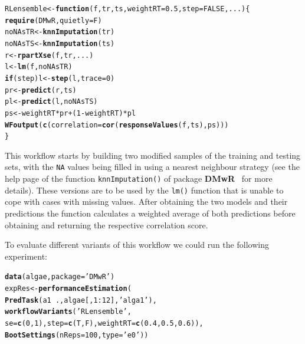 \documentclass[10pt,a4paper]{article}\usepackage[]{graphicx}\usepackage[]{color}
\makeatletter
\newcommand{\hlnum}[1]{\textcolor[rgb]{0.686,0.059,0.569}{#1}}%
\newcommand{\hlstr}[1]{\textcolor[rgb]{0.192,0.494,0.8}{#1}}%
\newcommand{\hlopt}[1]{\textcolor[rgb]{0,0,0}{#1}}%
\newcommand{\hlstd}[1]{\textcolor[rgb]{0.345,0.345,0.345}{#1}}%
\newcommand{\hlkwa}[1]{\textcolor[rgb]{0.161,0.373,0.58}{\textbf{#1}}}%
\newcommand{\hlkwb}[1]{\textcolor[rgb]{0.69,0.353,0.396}{#1}}%
\newcommand{\hlkwc}[1]{\textcolor[rgb]{0.333,0.667,0.333}{#1}}%
\newcommand{\hlkwd}[1]{\textcolor[rgb]{0.737,0.353,0.396}{\textbf{#1}}}%
\newenvironment{kframe}{%
 \def\at@end@of@kframe{}%
 \ifinner\ifhmode%
  \def\at@end@of@kframe{\end{minipage}}%
  \begin{minipage}{\columnwidth}%
 \fi\fi%
 \def\FrameCommand##1{\hskip\@totalleftmargin \hskip-\fboxsep
 \colorbox{shadecolor}{##1}\hskip-\fboxsep
     \hskip-\linewidth \hskip-\@totalleftmargin \hskip\columnwidth}%
 \MakeFramed {\advance\hsize-\width
   \@totalleftmargin\z@ \linewidth\hsize
   \@setminipage}}%
 {\par\unskip\endMakeFramed%
 \at@end@of@kframe}
\newenvironment{knitrout}{}{} %
\makeatother
\begin{document}
\begin{knitrout}
\color{fgcolor}\begin{kframe}
\begin{alltt}
\hlstd{RLensemble} \hlkwb{<-} \hlkwa{function}\hlstd{(}\hlkwc{f}\hlstd{,}\hlkwc{tr}\hlstd{,}\hlkwc{ts}\hlstd{,}\hlkwc{weightRT}\hlstd{=}\hlnum{0.5}\hlstd{,}\hlkwc{step}\hlstd{=}\hlnum{FALSE}\hlstd{,}\hlkwc{...}\hlstd{) \{}
  \hlkwd{require}\hlstd{(DMwR,}\hlkwc{quietly}\hlstd{=F)}
  \hlstd{noNAsTR} \hlkwb{<-} \hlkwd{knnImputation}\hlstd{(tr)}
  \hlstd{noNAsTS} \hlkwb{<-} \hlkwd{knnImputation}\hlstd{(ts)}
  \hlstd{r} \hlkwb{<-} \hlkwd{rpartXse}\hlstd{(f,tr,...)}
  \hlstd{l} \hlkwb{<-} \hlkwd{lm}\hlstd{(f,noNAsTR)}
  \hlkwa{if} \hlstd{(step) l} \hlkwb{<-} \hlkwd{step}\hlstd{(l,}\hlkwc{trace}\hlstd{=}\hlnum{0}\hlstd{)}
  \hlstd{pr} \hlkwb{<-} \hlkwd{predict}\hlstd{(r,ts)}
  \hlstd{pl} \hlkwb{<-} \hlkwd{predict}\hlstd{(l,noNAsTS)}
  \hlstd{ps} \hlkwb{<-} \hlstd{weightRT}\hlopt{*}\hlstd{pr}\hlopt{+}\hlstd{(}\hlnum{1}\hlopt{-}\hlstd{weightRT)}\hlopt{*}\hlstd{pl}
  \hlkwd{WFoutput}\hlstd{(}\hlkwd{c}\hlstd{(}\hlkwc{correlation}\hlstd{=}\hlkwd{cor}\hlstd{(}\hlkwd{responseValues}\hlstd{(f,ts),ps)))}
\hlstd{\}}
\end{alltt}
\end{kframe}
\end{knitrout}


This workflow starts by building two modified samples of the training
and testing sets, with the \texttt{NA} values being filled in using a
nearest neighbour strategy (see the help page of the function
\texttt{knnImputation()} of package \textbf{DMwR}~\cite{Tor10} for more
details). These versions are to be used by the \texttt{lm()} function
that is unable to cope with cases with missing values. After obtaining
the two models and their predictions the function calculates a
weighted average of both predictions before obtaining and returning
the respective correlation score.

To evaluate different variants of this workflow we could run the
following experiment:

\begin{knitrout}
\color{fgcolor}\begin{kframe}
\begin{alltt}
\hlkwd{data}\hlstd{(algae,}\hlkwc{package}\hlstd{=}\hlstr{'DMwR'}\hlstd{)}
\hlstd{expRes} \hlkwb{<-} \hlkwd{performanceEstimation}\hlstd{(}
  \hlkwd{PredTask}\hlstd{(a1} \hlopt{~} \hlstd{.,algae[,}\hlnum{1}\hlopt{:}\hlnum{12}\hlstd{],}\hlstr{'alga1'}\hlstd{),}
  \hlkwd{workflowVariants}\hlstd{(}\hlstr{'RLensemble'}\hlstd{,}
                  \hlkwc{se}\hlstd{=}\hlkwd{c}\hlstd{(}\hlnum{0}\hlstd{,}\hlnum{1}\hlstd{),}\hlkwc{step}\hlstd{=}\hlkwd{c}\hlstd{(T,F),}\hlkwc{weightRT}\hlstd{=}\hlkwd{c}\hlstd{(}\hlnum{0.4}\hlstd{,}\hlnum{0.5}\hlstd{,}\hlnum{0.6}\hlstd{)),}
  \hlkwd{BootSettings}\hlstd{(}\hlkwc{nReps}\hlstd{=}\hlnum{100}\hlstd{,}\hlkwc{type}\hlstd{=}\hlstr{'e0'}\hlstd{))}
\end{alltt}
\end{kframe}
\end{knitrout}
\end{document}
